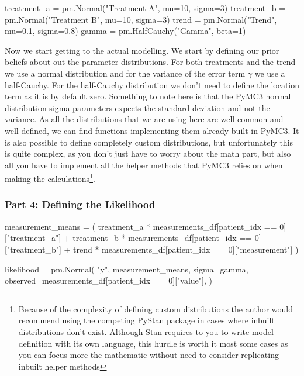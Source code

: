 \documentclass[12pt,a4paper,leqno]{report}
\theoremstyle{plain}
\theoremstyle{definition}
\theoremstyle{remark}
\begin{document}
\bigskip
\begin{pyverbatim}[][fontsize=\footnotesize]
    treatment_a = pm.Normal("Treatment A", mu=10, sigma=3)
    treatment_b = pm.Normal("Treatment B", mu=10, sigma=3)
    trend = pm.Normal("Trend", mu=0.1, sigma=0.8)
    gamma = pm.HalfCauchy("Gamma", beta=1)
\end{pyverbatim}
\smallskip

Now we start getting to the actual modelling. We start by defining our prior beliefs about
out the parameter distributions. For both treatments and the trend we use a normal distribution and
for the variance of the error term \(\gamma \) we use a half-Cauchy. For the half-Cauchy
distribution we don't need to define the location term as it is by default zero.
Something to note here is that the PyMC3 normal distribution sigma
parameters expects the standard deviation and not the variance. As all the distributions
that we are using here are well common and well defined, we can find functions implementing
them already built-in PyMC3. It is also possible to define completely custom
distributions, but unfortunately this is quite complex, as you don't just have to worry
about the math part, but also all you have to implement all the helper methods that PyMC3
relies on when making the calculations\footnote{Because of the complexity of defining
custom distributions the author would recommend using the competing PyStan package in
cases where inbuilt distributions don't exist. Although Stan requires to you to write
model definition with its own language, this hurdle is worth it most some cases as you can focus
more the mathematic without need to consider replicating inbuilt helper methods}.

\subsubsection*{Part 4: Defining the Likelihood}

\bigskip
\begin{pyverbatim}[][fontsize=\footnotesize]
    measurement_means = (
        treatment_a
        * measurements_df[patient_idx == 0]["treatment_a"]
        + treatment_b
        * measurements_df[patient_idx == 0]["treatment_b"]
        + trend
        * measurements_df[patient_idx == 0]["measurement"]
    )

    likelihood = pm.Normal(
        "y",
        measurement_means,
        sigma=gamma,
        observed=measurements_df[patient_idx == 0]["value"],
    )
\end{pyverbatim}
\smallskip
\end{document}

